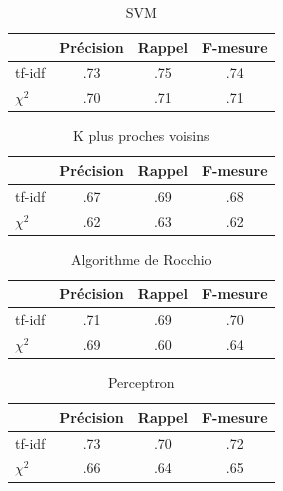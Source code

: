 \documentclass[a4paper,12pt]{article}
\begin{document}
		\begin{table}[h!]
			\centering
			\begin{tabular}{l|c c c}
				& Précision & Rappel & F-mesure\\
				\hline
				tf-idf & .73 & .75 & .74\\
				$\chi^2$ & .70 & .71 & .71\\
			\end{tabular}
			\caption{SVM}
		\end{table}

		\begin{table}[h!]
			\centering
			\begin{tabular}{l|c c c}
				& Précision & Rappel & F-mesure\\
				\hline
				tf-idf & .67 & .69 & .68\\
				$\chi^2$ & .62 & .63 & .62\\
			\end{tabular}
			\caption{K plus proches voisins}
		\end{table}

		\begin{table}[h!]
			\centering
			\begin{tabular}{l|c c c}
				& Précision & Rappel & F-mesure\\
				\hline
				tf-idf & .71 & .69 & .70\\
				$\chi^2$ & .69 & .60 & .64\\
			\end{tabular}
			\caption{Algorithme de Rocchio}
		\end{table}

		\begin{table}[h!]
			\centering
			\begin{tabular}{l|c c c}
				& Précision & Rappel & F-mesure\\
				\hline
				tf-idf & .73 & .70 & .72\\
				$\chi^2$ & .66 & .64 & .65\\
			\end{tabular}
			\caption{Perceptron}
		\end{table}
\end{document}

